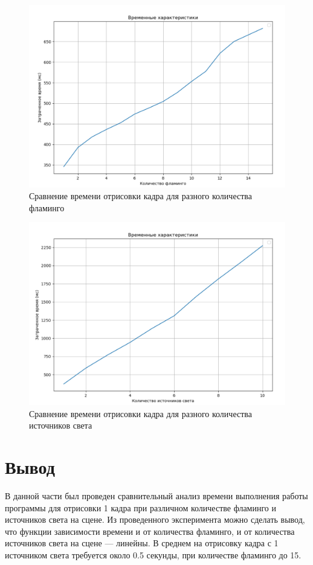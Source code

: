 \begin{figure}[h!]
	\centering
	\includegraphics[width=0.9\linewidth]{img/flams}
	\caption{Сравнение времени отрисовки кадра для разного количества фламинго}
	\label{fig:flams}
\end{figure}

\begin{figure}[h!]
	\centering
	\includegraphics[width=0.9\linewidth]{img/lights}
	\caption{Сравнение времени отрисовки кадра для разного количества источников света}
	\label{fig:lights}
\end{figure}
\clearpage

\section*{Вывод}

В данной части был проведен сравнительный анализ времени выполнения работы программы для отрисовки 1 кадра при различном количестве фламинго и источников света на сцене. Из проведенного эксперимента можно сделать вывод, что функции зависимости времени и от количества фламинго, и от количества источников света на сцене --- линейны. В среднем на отрисовку кадра с 1 источником света требуется около 0.5 секунды, при количестве фламинго до 15.